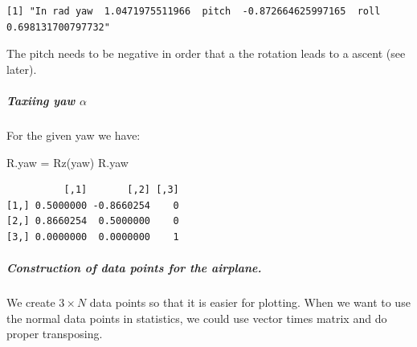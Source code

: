 \documentclass[
  letterpaper,
  DIV=11,
  numbers=noendperiod]{scrartcl}
\let\oldsubparagraph\subparagraph
\renewcommand{\subparagraph}[1]{\oldsubparagraph{#1}\mbox{}}
\newenvironment{Shaded}{\begin{snugshade}}{\end{snugshade}}
\newcommand{\FunctionTok}[1]{\textcolor[rgb]{0.28,0.35,0.67}{#1}}
\newcommand{\NormalTok}[1]{\textcolor[rgb]{0.00,0.23,0.31}{#1}}
\newcommand{\OtherTok}[1]{\textcolor[rgb]{0.00,0.23,0.31}{#1}}
\begin{document}
\begin{verbatim}
[1] "In rad yaw  1.0471975511966  pitch  -0.872664625997165  roll  0.698131700797732"
\end{verbatim}

The pitch needs to be negative in order that a the rotation leads to a
ascent (see later).

\hypertarget{taxiing-yaw-alpha}{%
\subparagraph{\texorpdfstring{Taxiing yaw
\(\alpha\)}{Taxiing yaw \textbackslash alpha}}\label{taxiing-yaw-alpha}}

For the given yaw we have:

\begin{Shaded}
\begin{Highlighting}[]
\NormalTok{R.yaw }\OtherTok{=} \FunctionTok{Rz}\NormalTok{(yaw) }
\NormalTok{R.yaw}
\end{Highlighting}
\end{Shaded}

\begin{verbatim}
          [,1]       [,2] [,3]
[1,] 0.5000000 -0.8660254    0
[2,] 0.8660254  0.5000000    0
[3,] 0.0000000  0.0000000    1
\end{verbatim}

\hypertarget{construction-of-data-points-for-the-airplane.}{%
\subparagraph{Construction of data points for the
airplane.}\label{construction-of-data-points-for-the-airplane.}}

We create \(3 \times N\) data points so that it is easier for plotting.
When we want to use the normal data points in statistics, we could use
vector times matrix and do proper transposing.
\end{document}
